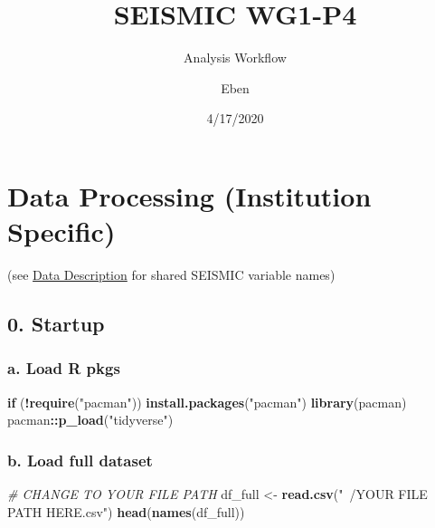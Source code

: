 \documentclass[]{article}
\title{SEISMIC WG1-P4}
\subtitle{Analysis Workflow}
\author{Eben}
\date{4/17/2020}
\newenvironment{Shaded}{\begin{snugshade}}{\end{snugshade}}
\newcommand{\KeywordTok}[1]{\textcolor[rgb]{0.13,0.29,0.53}{\textbf{#1}}}
\newcommand{\StringTok}[1]{\textcolor[rgb]{0.31,0.60,0.02}{#1}}
\newcommand{\CommentTok}[1]{\textcolor[rgb]{0.56,0.35,0.01}{\textit{#1}}}
\newcommand{\ControlFlowTok}[1]{\textcolor[rgb]{0.13,0.29,0.53}{\textbf{#1}}}
\newcommand{\OperatorTok}[1]{\textcolor[rgb]{0.81,0.36,0.00}{\textbf{#1}}}
\newcommand{\NormalTok}[1]{#1}
\begin{document}
\maketitle

{
\setcounter{tocdepth}{2}
\tableofcontents
}
\section{\texorpdfstring{\textbf{Data Processing (Institution
Specific)}}{Data Processing (Institution Specific)}}\label{data-processing-institution-specific}

(see
\href{https://docs.google.com/spreadsheets/d/1SzU4PcIEUsAGnKKyAcugHO2O2aZW29sf9a_cC-FAElk/edit\#gid=1679989021}{Data
Description} for shared SEISMIC variable names)

\subsection{0. Startup}\label{startup}

\subsubsection{a. Load R pkgs}\label{a.-load-r-pkgs}

\begin{Shaded}
\begin{Highlighting}[]
\ControlFlowTok{if}\NormalTok{ (}\OperatorTok{!}\KeywordTok{require}\NormalTok{(}\StringTok{"pacman"}\NormalTok{)) }\KeywordTok{install.packages}\NormalTok{(}\StringTok{"pacman"}\NormalTok{)}
\KeywordTok{library}\NormalTok{(pacman)}
\NormalTok{pacman}\OperatorTok{::}\KeywordTok{p_load}\NormalTok{(}\StringTok{"tidyverse"}\NormalTok{)}
\end{Highlighting}
\end{Shaded}

\subsubsection{b. Load full dataset}\label{b.-load-full-dataset}

\begin{Shaded}
\begin{Highlighting}[]
\CommentTok{# CHANGE TO YOUR FILE PATH}
\NormalTok{df_full <-}\StringTok{ }\KeywordTok{read.csv}\NormalTok{(}\StringTok{"~/YOUR FILE PATH HERE.csv"}\NormalTok{)}
\KeywordTok{head}\NormalTok{(}\KeywordTok{names}\NormalTok{(df_full))}
\end{Highlighting}
\end{Shaded}
\end{document}
